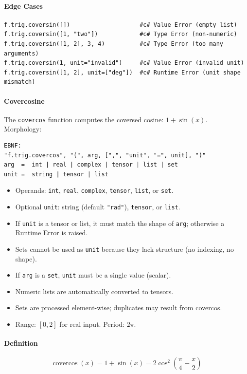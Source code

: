 \paragraph{Edge Cases}
\begin{verbatim}
f.trig.coversin([])                    #c# Value Error (empty list)
f.trig.coversin([1, "two"])            #c# Type Error (non-numeric)
f.trig.coversin([1, 2], 3, 4)          #c# Type Error (too many arguments)
f.trig.coversin(1, unit="invalid")     #c# Value Error (invalid unit)
f.trig.coversin([1, 2], unit=["deg"])  #c# Runtime Error (unit shape mismatch)
\end{verbatim}

\paragraph{Covercosine}
The \texttt{covercos} function computes the coversed cosine: $1 + \sin(x)$.\\
Morphology:
\begin{verbatim}
EBNF:
"f.trig.covercos", "(", arg, [",", "unit", "=", unit], ")"
arg  =  int | real | complex | tensor | list | set
unit =  string | tensor | list
\end{verbatim}
\begin{itemize}
\item Operands: \texttt{int}, \texttt{real}, \texttt{complex}, \texttt{tensor}, \texttt{list}, or \texttt{set}.
\item Optional \texttt{unit}: string (default \texttt{"rad"}), \texttt{tensor}, or \texttt{list}.
\item If \texttt{unit} is a tensor or list, it must match the shape of \texttt{arg}; otherwise a Runtime Error is raised.
\item Sets cannot be used as \texttt{unit} because they lack structure (no indexing, no shape).
\item If \texttt{arg} is a \texttt{set}, \texttt{unit} must be a single value (scalar).
\item Numeric lists are automatically converted to tensors.
\item Sets are processed element-wise; duplicates may result from covercos.
\item Range: $[0, 2]$ for real input. Period: $2\pi$.
\end{itemize}

\paragraph{Definition}
\[
\operatorname{covercos}(x) = 1 + \sin(x) = 2\cos^2\left(\frac{\pi}{4} - \frac{x}{2}\right)
\]

